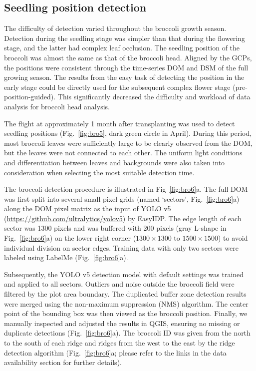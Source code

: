 \subsection{Seedling position detection}

The difficulty of detection varied throughout the broccoli growth season. Detection during the seedling stage was simpler than that during the flowering stage, and the latter had complex leaf occlusion. The seedling position of the broccoli was almost the same as that of the broccoli head. Aligned by the GCPs, the positions were consistent through the time-series DOM and DSM of the full growing season. The results from the easy task of detecting the position in the early stage could be directly used for the subsequent complex flower stage (pre-position-guided). This significantly decreased the difficulty and workload of data analysis for broccoli head analysis.

The flight at approximately 1 month after transplanting was used to detect seedling positions (Fig.~\ref{fig:bro5}, dark green circle in April). During this period, most broccoli leaves were sufficiently large to be clearly observed from the DOM, but the leaves were not connected to each other. The uniform light conditions and differentiation between leaves and backgrounds were also taken into consideration when selecting the most suitable detection time.

The broccoli detection procedure is illustrated in Fig~\ref{fig:bro6}a. The full DOM was first split into several small pixel grids (named `sectors', Fig.~\ref{fig:bro6}a) along the DOM pixel matrix as the input of YOLO v5 (\url{https://github.com/ultralytics/yolov5}) by EasyIDP. The edge length of each sector was 1300 pixels and was buffered with 200 pixels (gray L-shape in Fig.~\ref{fig:bro6}a) on the lower right corner ($1300 \times 1300$ to $1500 \times 1500$) to avoid individual division on sector edges. Training data with only two sectors were labeled using LabelMe (Fig.~\ref{fig:bro6}a). 

Subsequently, the YOLO v5 detection model with default settings was trained and applied to all sectors. Outliers and noise outside the broccoli field were filtered by the plot area boundary. The duplicated buffer zone detection results were merged using the non-maximum suppression (NMS) algorithm. The center point of the bounding box was then viewed as the broccoli position. Finally, we manually inspected and adjusted the results in QGIS, ensuring no missing or duplicate detections (Fig.~\ref{fig:bro6}a). The broccoli ID was given from the north to the south of each ridge and ridges from the west to the east by the ridge detection algorithm (Fig.~\ref{fig:bro6}a; please refer to the links in the data availability section for further details). 

